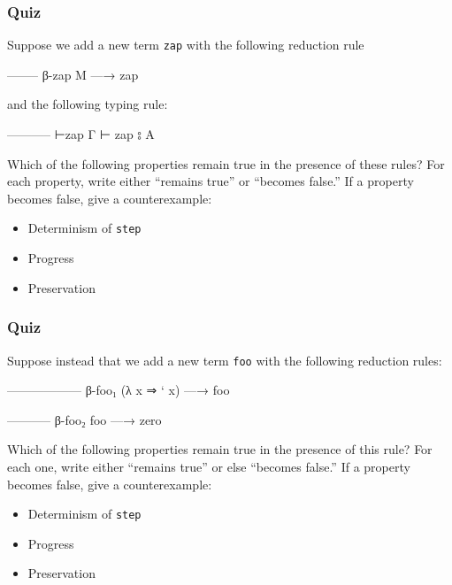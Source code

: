 \hypertarget{quiz}{%
\subsubsection{Quiz}\label{quiz}}

Suppose we add a new term \texttt{zap} with the following reduction rule

\begin{myDisplay}
-------- β-zap
M —→ zap
\end{myDisplay}

and the following typing rule:

\begin{myDisplay}
----------- ⊢zap
Γ ⊢ zap ⦂ A
\end{myDisplay}

Which of the following properties remain true in the presence of these
rules? For each property, write either ``remains true'' or ``becomes
false.'' If a property becomes false, give a counterexample:

\begin{itemize}
\item
  Determinism of \texttt{step}
\item
  Progress
\item
  Preservation
\end{itemize}

\hypertarget{quiz-1}{%
\subsubsection{Quiz}\label{quiz-1}}

Suppose instead that we add a new term \texttt{foo} with the following
reduction rules:

\begin{myDisplay}
------------------ β-foo₁
(λ x ⇒ ` x) —→ foo

----------- β-foo₂
foo —→ zero
\end{myDisplay}

Which of the following properties remain true in the presence of this
rule? For each one, write either ``remains true'' or else ``becomes
false.'' If a property becomes false, give a counterexample:

\begin{itemize}
\item
  Determinism of \texttt{step}
\item
  Progress
\item
  Preservation
\end{itemize}

